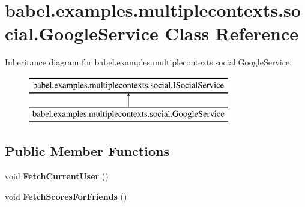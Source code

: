 \hypertarget{classbabel_1_1examples_1_1multiplecontexts_1_1social_1_1_google_service}{\section{babel.\-examples.\-multiplecontexts.\-social.\-Google\-Service Class Reference}
\label{classbabel_1_1examples_1_1multiplecontexts_1_1social_1_1_google_service}
}
Inheritance diagram for babel.\-examples.\-multiplecontexts.\-social.\-Google\-Service\-:\begin{figure}[H]
\begin{center}
\leavevmode
\includegraphics[height=2.000000cm]{classbabel_1_1examples_1_1multiplecontexts_1_1social_1_1_google_service}
\end{center}
\end{figure}
\subsection*{Public Member Functions}
\begin{DoxyCompactItemize}
\item 
\hypertarget{classbabel_1_1examples_1_1multiplecontexts_1_1social_1_1_google_service_ae4dab2cf63225a8727fbb44d73331d29}{void {\bfseries Fetch\-Current\-User} ()}\label{classbabel_1_1examples_1_1multiplecontexts_1_1social_1_1_google_service_ae4dab2cf63225a8727fbb44d73331d29}

\item 
\hypertarget{classbabel_1_1examples_1_1multiplecontexts_1_1social_1_1_google_service_a109313b37c86a26306769e597bc02780}{void {\bfseries Fetch\-Scores\-For\-Friends} ()}\label{classbabel_1_1examples_1_1multiplecontexts_1_1social_1_1_google_service_a109313b37c86a26306769e597bc02780}

\end{DoxyCompactItemize}
